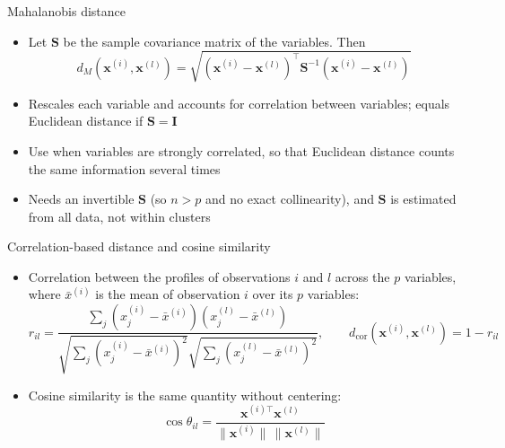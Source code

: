 \begin{frame}{Mahalanobis distance}
    \begin{itemize}
        \item Let $\mathbf{S}$ be the sample covariance matrix of the variables. Then
        \[
            d_M(\mathbf{x}^{(i)}, \mathbf{x}^{(l)}) = \sqrt{(\mathbf{x}^{(i)} - \mathbf{x}^{(l)})^\top \mathbf{S}^{-1} (\mathbf{x}^{(i)} - \mathbf{x}^{(l)})}
        \]
        \item Rescales each variable and accounts for correlation between variables; equals Euclidean distance if $\mathbf{S} = \mathbf{I}$
        \item Use when variables are strongly correlated, so that Euclidean distance counts the same information several times
        \item Needs an invertible $\mathbf{S}$ (so $n > p$ and no exact collinearity), and $\mathbf{S}$ is estimated from all data, not within clusters
    \end{itemize}
\end{frame}

\begin{frame}{Correlation-based distance and cosine similarity}
    \begin{itemize}
        \item Correlation between the profiles of observations $i$ and $l$ across the $p$ variables, where $\bar{x}^{(i)}$ is the mean of observation $i$ over its $p$ variables:
        \[
            r_{il} = \frac{\sum_{j} (x_j^{(i)} - \bar{x}^{(i)})(x_j^{(l)} - \bar{x}^{(l)})}{\sqrt{\sum_{j} (x_j^{(i)} - \bar{x}^{(i)})^2} \sqrt{\sum_{j} (x_j^{(l)} - \bar{x}^{(l)})^2}}, \qquad d_{\text{cor}}(\mathbf{x}^{(i)}, \mathbf{x}^{(l)}) = 1 - r_{il}
        \]
        \item Cosine similarity is the same quantity without centering:
        \[
            \cos\theta_{il} = \frac{\mathbf{x}^{(i)\top} \mathbf{x}^{(l)}}{\lVert \mathbf{x}^{(i)} \rVert \, \lVert \mathbf{x}^{(l)} \rVert}
        \]
    \end{itemize}
\end{frame}

